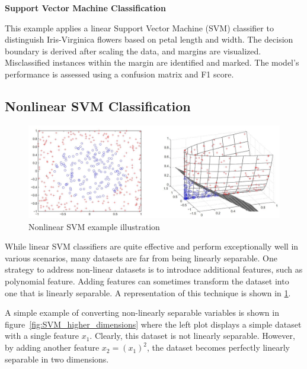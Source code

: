 \documentclass[12pt,letter]{article}
\begin{document}
\begin{example}
\textbf{Support Vector Machine Classification}

This example applies a linear Support Vector Machine (SVM) classifier to distinguish Iris-Virginica flowers based on petal length and width. The decision boundary is derived after scaling the data, and margins are visualized. Misclassified instances within the margin are identified and marked. The model's performance is assessed using a confusion matrix and F1 score.
\end{example}


\subsection{Nonlinear SVM Classification}

\begin{figure}[H]
	\centering
	\includegraphics[width=6.5in]{../figures/nonlinear_SVM_example_illustration}
	\caption{Nonlinear SVM example illustration \protect\footnotemark[1]}
	\label{fig:nonlinear_SVM_example_illustration}
\end{figure}

While linear SVM classifiers are quite effective and perform exceptionally well in various scenarios, many datasets are far from being linearly separable. One strategy to address non-linear datasets is to introduce additional features, such as polynomial feature. Adding features can sometimes transform the dataset into one that is linearly separable. A representation of this technique is shown in \ref{fig:nonlinear_SVM_example_illustration}.

A simple example of converting non-linearly separable variables is shown in figure~\ref{fig:SVM_higher_dimensions} where the left plot displays a simple dataset with a single feature $x_1$. Clearly, this dataset is not linearly separable. However, by adding another feature $x_2 = (x_1)^2$, the dataset becomes perfectly linearly separable in two dimensions.
\end{document}
